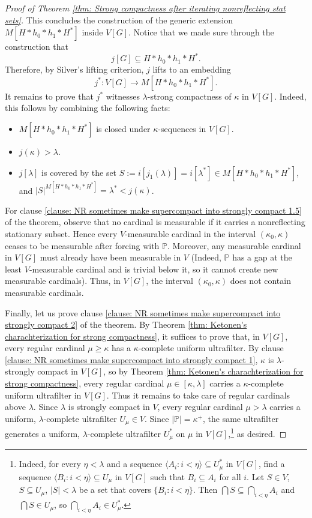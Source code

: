 \documentclass[11pt]{amsart}
\theoremstyle{definition}
\theoremstyle{remark}
\newcommand\<{{<}}
\newcommand{\po}{\mathbb{P}}
\newcommand{\la}{\langle}
\newcommand{\ra}{\rangle}
\begin{document}
\begin{proof}[Proof of Theorem \ref{thm: Strong compactness after iterating nonreflecting stat sets}]
This concludes the construction of the generic extension $M[H*h_0*h_1*H^*]$ inside $V[G]$. Notice that we made sure through the construction that $$j[G]\subseteq H*h_0*h_1*H^*.$$
Therefore, by Silver's lifting criterion, $j$ lifts to an embedding $$j^*\colon V[G]\rightarrow M[H\ast h_0 \ast h_1 \ast H^*].$$ It remains to prove that $j^*$  witnesses $\lambda$-strong compactness of $\kappa$ in $V[G]$. Indeed, this follows by combining the following facts:
    \begin{itemize}
        \item $M[H\ast h_0\ast h_1\ast H^*]$ is closed under $\kappa$-sequences in $V[G]$.
        \item $j(\kappa)> \lambda$. 
        \item $j[\lambda]$ is covered by the set $S:=i[j_1(\lambda)] = i[\lambda^*]\in M[H\ast h_0 \ast h_1 \ast H^*]$, and $|S|^{M[H\ast h_0 \ast h_1 \ast H^*]}=\lambda^* <j(\kappa)$.
    \end{itemize}

    For clause \eqref{clause: NR sometimes make supercompact into strongly compact 1.5} of the theorem, observe that no cardinal is measurable if it carries a nonreflecting stationary subset. Hence every $V$-measurable cardinal in the interval $(\kappa_0, \kappa)$ ceases to be measurable after forcing with $\po$. Moreover, any measurable cardinal in $V[G]$ must already have been measurable in $V$ (Indeed, $\po$ has a gap at the least $V$-measurable cardinal and is trivial below it, so it cannot create new measurable cardinals). Thus, in $V[G]$, the interval $(\kappa_0,\kappa)$ does not contain measurable cardinals.
  
    Finally, let us prove clause \eqref{clause: NR sometimes make supercompact into strongly compact 2} of the theorem. By Theorem \ref{thm: Ketonen's charachterization for strong compactness}, it suffices to prove that, in $V[G]$, every regular cardinal $\mu\geq \kappa$ has a $\kappa$-complete uniform ultrafilter. By clause \eqref{clause: NR sometimes make supercompact into strongly compact 1}, $\kappa$ is $\lambda$-strongly compact in $V[G]$, so by Theorem \ref{thm: Ketonen's charachterization for strong compactness}, every regular cardinal $\mu\in [\kappa, \lambda]$ carries a $\kappa$-complete uniform ultrafilter in $V[G]$. Thus it remains to take care of regular cardinals above $\lambda$. Since $\lambda$ is strongly compact in $V$, every regular cardinal $\mu> \lambda$ carries a uniform, $\lambda$-complete ultrafilter $U_\mu\in V$. Since $|\po| = \kappa^+$, the same ultrafilter generates a uniform, $\lambda$-complete ultrafilter $U^*_\mu$ on $\mu$ in $V[G]$,\footnote{Indeed, for every $\eta<\lambda$ and a sequence $\la A_i \colon i<\eta \ra \subseteq U^*_\mu$ in $V[G]$, find a sequence $\la B_i \colon i<\eta \ra\subseteq U_\mu$ in $V[G]$ such that $B_i \subseteq A_i$ for all $i$. Let $S\in V$, $S\subseteq U_\mu$, $|S|<\lambda$ be a set that covers $\{ B_i\colon i<\eta \}$. Then $\bigcap S\subseteq \bigcap_{i<\eta} A_i$ and $\bigcap S\in U_\mu$, so $\bigcap_{i<\eta} A_i\in U^*_\mu$.} as desired.
\end{proof}
\end{document}
